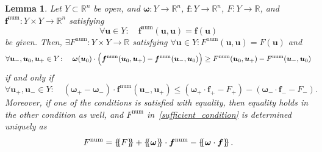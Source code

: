 \documentclass[10pt,a4paper]{amsart}
\newtheorem{lemma}{Lemma}
\newcommand*{\ldblbrace}{\{\mskip-5mu \left \{}
\newcommand*{\rdblbrace}{ \}\mskip-5mu \right \}}
\newcommand{\mean}[1]{\left\ldblbrace #1 \right\rdblbrace}
\renewcommand{\vec}[1]{\boldsymbol{#1}}
\begin{document}
\begin{lemma}{\label{algebraic_lemma}}
    Let $Y \subset \mathbb{R}^n$ be open, and $\vec{\omega}\colon Y \to \mathbb{R}^n$, $\vec{f}\colon Y \to \mathbb{R}^n$, $F\colon Y \to \mathbb{R}$, and $\vec{f}^{\mathrm{num}}\colon Y \times Y \to \mathbb{R}^n$ satisfying
    \begin{equation}
    \forall \vec{u} \in Y\colon \quad \vec{f}^\mathrm{num}(\vec{u},\vec{u}) = \vec{f}(\vec{u})
    \end{equation}
    be given. Then,
    $\exists F^\mathrm{num}\colon Y \times Y \to \mathbb{R}$ satisfying $\forall \vec{u} \in Y\colon F^\mathrm{num}(\vec{u},\vec{u}) = F(\vec{u})$ and
    \begin{equation}
    \forall \vec{u}_-, \vec{u}_0, \vec{u}_+ \in Y\colon \quad \vec{\omega}(\vec{u}_0) \cdot \Bigl ( \vec{f}^\mathrm{num}(\vec{u}_0, \vec{u}_+) - \vec{f}^\mathrm{num}(\vec{u}_-, \vec{u}_0) \Bigr ) \geq F^\mathrm{num}(\vec{u}_0, \vec{u}_+) - F^\mathrm{num}(\vec{u}_-, \vec{u}_0)
    \label{sufficient_condition}
    \end{equation}
    if and only if
    \begin{equation}
    \forall \vec{u}_+, \vec{u}_- \in Y\colon \quad \left (\vec{\omega}_+ - \vec{\omega}_- \right ) \cdot \vec{f}^\mathrm{num}(\vec{u}_-, \vec{u}_+) \leq \left (\vec{\omega}_+ \cdot \vec{f}_+ - F_+ \right ) - \left (\vec{\omega}_- \cdot \vec{f}_- - F_- \right ).
    \label{necessary_condition}
    \end{equation}
    Moreover, if one of the conditions is satisfied with equality, then equality holds in the other condition as well, and $F^\mathrm{num}$ in~\eqref{sufficient_condition} is determined uniquely as
    \begin{equation}
    F^{\mathrm{num}} = \mean{F} + \mean{\vec{\omega}} \cdot \vec{f}^{\mathrm{num}}  -\mean{\vec{\omega} \cdot \vec{f}}.
    \label{F_num}
    \end{equation}
\end{lemma}
\end{document}
